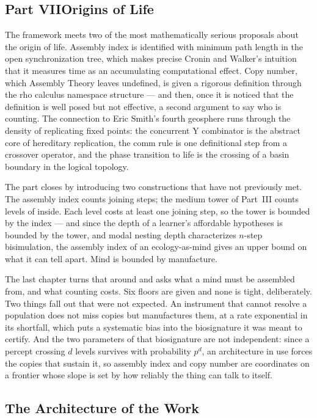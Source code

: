 \documentclass[12pt,openright,twoside]{book}
\theoremstyle{remark}
\theoremstyle{plain}
\theoremstyle{remark}
\theoremstyle{plain}
\theoremstyle{plain}
\begin{document}
\subsection*{Part VII\quad Origins of Life}

The framework meets two of the most mathematically serious proposals
about the origin of life.
Assembly index is identified with minimum path length in the open
synchronization tree, which makes precise Cronin and Walker's intuition
that it measures time as an accumulating computational effect.
Copy number, which Assembly Theory leaves undefined, is given a rigorous
definition through the rho calculus namespace structure --- and then, once
it is noticed that the definition is well posed but not effective, a
second argument to say who is counting.
The connection to Eric Smith's fourth geosphere runs through the density
of replicating fixed points: the concurrent Y combinator is the abstract
core of hereditary replication, the comm rule is one definitional step
from a crossover operator, and the phase transition to life is the
crossing of a basin boundary in the logical topology.

The part closes by introducing two constructions that have not previously
met.
The assembly index counts joining steps; the medium tower of Part~III
counts levels of inside.
Each level costs at least one joining step, so the tower is bounded by
the index --- and since the depth of a learner's affordable hypotheses is
bounded by the tower, and modal nesting depth characterizes $n$-step
bisimulation, the assembly index of an ecology-as-mind gives an upper
bound on what it can tell apart.
Mind is bounded by manufacture.

The last chapter turns that around and asks what a mind must be
assembled from, and what counting costs.
Six floors are given and none is tight, deliberately.
Two things fall out that were not expected.
An instrument that cannot resolve a population does not miss copies but
manufactures them, at a rate exponential in its shortfall, which puts a
systematic bias into the biosignature it was meant to certify.
And the two parameters of that biosignature are not independent: since a
percept crossing $d$ levels survives with probability $p^{d}$, an
architecture in use forces the copies that sustain it, so assembly index
and copy number are coordinates on a frontier whose slope is set by how
reliably the thing can talk to itself.

\bigskip

\subsection*{The Architecture of the Work}
\end{document}
